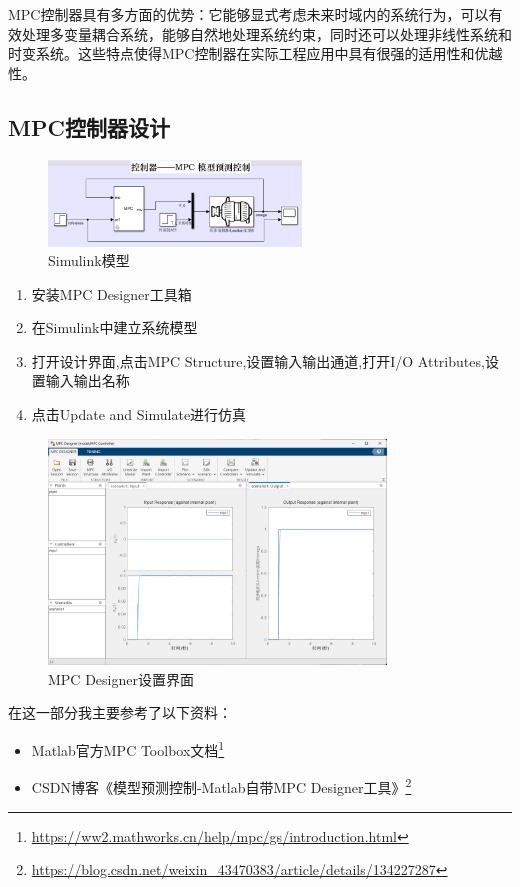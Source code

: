 \documentclass[12pt,a4paper,UTF8]{article}
\begin{document}
MPC控制器具有多方面的优势：它能够显式考虑未来时域内的系统行为，可以有效处理多变量耦合系统，能够自然地处理系统约束，同时还可以处理非线性系统和时变系统。这些特点使得MPC控制器在实际工程应用中具有很强的适用性和优越性。


\subsection{MPC控制器设计}

\begin{figure}[htbp]
    \centering
    \includegraphics[width=0.6\textwidth]{20241230093059.png}
    \caption{Simulink模型}
\end{figure}
\begin{enumerate}
\item 安装MPC Designer工具箱
\item 在Simulink中建立系统模型
\item 打开设计界面,点击MPC Structure,设置输入输出通道,打开I/O Attributes,设置输入输出名称
\item 点击Update and Simulate进行仿真
\end{enumerate}

\begin{figure}[htbp]
    \centering
    \includegraphics[width=0.8\textwidth]{20241230093026.png}
    \caption{MPC Designer设置界面}
\end{figure}

在这一部分我主要参考了以下资料：
\begin{itemize}
\item Matlab官方MPC Toolbox文档\footnote{\url{https://ww2.mathworks.cn/help/mpc/gs/introduction.html}}
\item CSDN博客《模型预测控制-Matlab自带MPC Designer工具》\footnote{\url{https://blog.csdn.net/weixin_43470383/article/details/134227287}}
\end{itemize}
\end{document}
